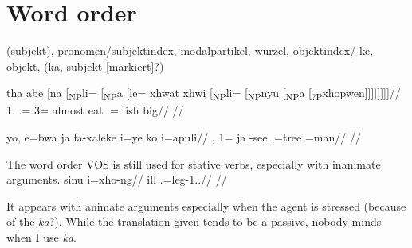 \chapter{Word order} 
\label{ChapterWO} 


(subjekt), pronomen/subjektindex, modalpartikel, wurzel, objektindex/-ke, objekt, (ka, subjekt [markiert]?)


\pex
\label{ex:tree}
\a
\begingl
\gla tha abe [na [\textsubscript{NP}li= [\textsubscript{NP}a [le= xhwat xhwi [\textsubscript{NP}li= [\textsubscript{NP}nyu [\textsubscript{NP}a [\textsubscript{?P}xhopwen]]]]]]]]//
\glb {}  1.  .=  3= almost eat .= fish  big//
\glft {}//
\endgl

\a
\begingl
\gla  yo, e=bwa ja fa-xaleke i=ye ko i=apuli//
, 1= ja -see .=tree  =man//
\glft {}//
\endgl
\xe

The word order VOS is still used for stative verbs, especially with inanimate arguments.
\ex
\begingl
\gla sinu i=xho-ng//
\glb ill .=leg-1..//
\glft {}//
\endgl
\xe



It appears with animate arguments especially when the agent is stressed (because of the \textit{ka}?). While the translation given tends to be a passive, nobody minds when I use \textit{ka}.

